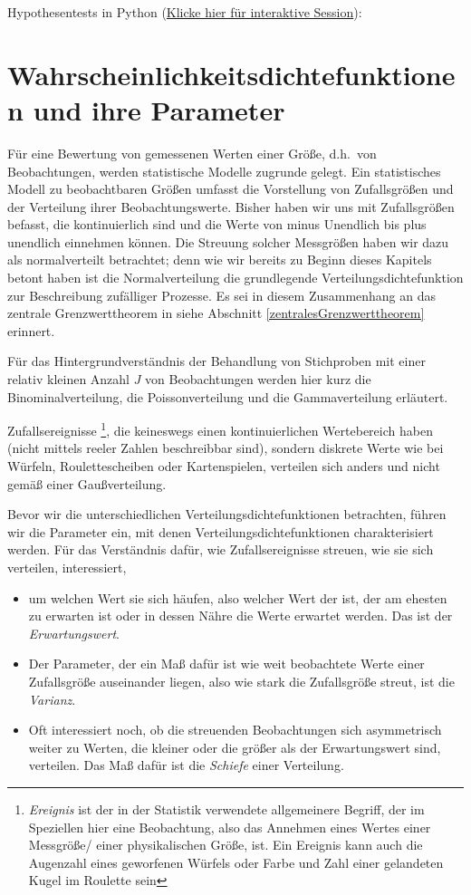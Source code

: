 Hypothesentests in Python (\href{https://mybinder.org/v2/gh/dhueser/MDA-Vorlesung-iprom-tu-bs/master?urlpath=/lab/tree/vorlesung/05_vorlesung/code/hypothesentests.ipynb}{Klicke hier für interaktive Session}):



\section{Wahrscheinlichkeitsdichtefunktionen und ihre Parameter}

Für eine Bewertung von gemessenen Werten einer Größe, d.h.\ von Beobachtungen, werden
statistische Modelle zugrunde gelegt. Ein statistisches Modell zu beobachtbaren Größen
umfasst die Vorstellung von Zufallsgrößen und der Verteilung ihrer Beobachtungswerte.
Bisher haben wir uns mit Zufallsgrößen befasst, die kontinuierlich sind und die Werte von
minus Unendlich bis plus unendlich einnehmen können. Die Streuung solcher Messgrößen haben
wir dazu als normalverteilt betrachtet; denn wie wir bereits zu Beginn dieses Kapitels betont
haben ist die Normalverteilung die grundlegende Verteilungsdichtefunktion zur Beschreibung
zufälliger Prozesse. Es sei in diesem Zusammenhang an das zentrale Grenzwerttheorem in
siehe Abschnitt \ref{zentralesGrenzwerttheorem} erinnert.

Für das Hintergrundverständnis der Behandlung von Stichproben mit einer relativ kleinen Anzahl $J$ von
Beobachtungen werden hier kurz die Binominalverteilung, die Poissonverteilung und die Gammaverteilung erläutert.

Zufallsereignisse \footnote{\textsl{Ereignis} ist der in der Statistik verwendete
allgemeinere Begriff, der im Speziellen hier eine Beobachtung, also das Annehmen eines Wertes einer
Messgröße/ einer physikalischen Größe, ist. Ein Ereignis kann auch die Augenzahl eines geworfenen Würfels
oder Farbe und Zahl einer gelandeten Kugel im Roulette sein}, die keineswegs einen kontinuierlichen
Wertebereich haben (nicht mittels reeler Zahlen beschreibbar sind), sondern diskrete Werte wie bei
Würfeln, Roulettescheiben oder Kartenspielen, verteilen sich anders und nicht gemäß einer Gaußverteilung.

Bevor wir die unterschiedlichen Verteilungsdichtefunktionen betrachten, führen wir die Parameter ein,
mit denen Verteilungsdichtefunktionen charakterisiert werden.
Für das Verständnis dafür, wie Zufallsereignisse streuen, wie sie sich verteilen, interessiert,
\begin{itemize}
\item um welchen
Wert sie sich häufen, also welcher Wert der ist, der am ehesten zu erwarten ist oder in dessen Nähre die Werte
erwartet werden. Das ist der \textsl{Erwartungswert}.
\item Der Parameter, der ein Maß dafür ist wie weit beobachtete Werte einer Zufallsgröße auseinander liegen, also wie stark die Zufallsgröße streut, ist die \textsl{Varianz}.
\item Oft interessiert noch, ob die streuenden Beobachtungen sich asymmetrisch weiter zu Werten, die kleiner
oder die größer als der Erwartungswert sind, verteilen. Das Maß dafür ist die \textsl{Schiefe} einer Verteilung.
\end{itemize}

